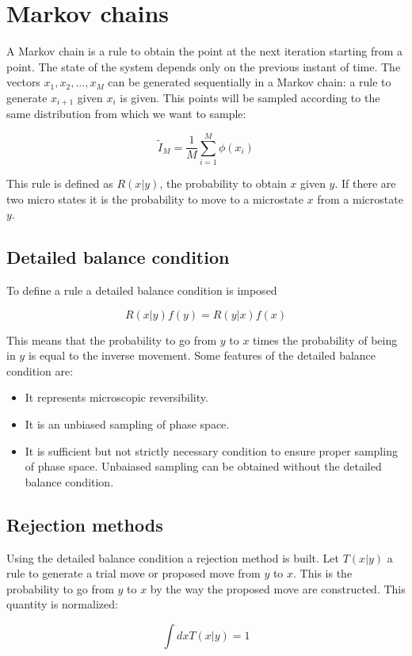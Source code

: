\section{Markov chains}
A Markov chain is a rule to obtain the point at the next iteration starting from a point.
The state of the system depends only on the previous instant of time.
The vectors $x_1, x_2, \dots, x_M$ can be generated sequentially in a Markov chain: a rule to generate $x_{i+1}$ given $x_i$ is given.
This points will be sampled according to the same distribution from which we want to sample:

$$\tilde{I}_M = \frac{1}{M}\sum\limits_{i=1}^M\phi(x_i)$$

This rule is defined as $R(x|y)$,  the probability to obtain $x$ given $y$.
If there are two micro states it is the probability to move to a microstate $x$ from a microstate $y$.

	\subsection{Detailed balance condition}
	To define a rule a detailed balance condition is imposed

	$$R(x|y)f(y) = R(y|x)f(x)$$

	This means that the probability to go from $y$ to $x$ times the probability of being in $y$  is equal to the inverse movement.
	Some features of the detailed balance condition are:

	\begin{itemize}
		\item It represents microscopic reversibility.
		\item It is an unbiased sampling of phase space.
		\item It is sufficient but not strictly necessary condition to ensure proper sampling of phase space.
			Unbaiased sampling can be obtained without the detailed balance condition.
	\end{itemize}

	\subsection{Rejection methods}
	Using the detailed balance condition a rejection method is built.
	Let $T(x|y)$ a rule to generate a trial move or proposed move from $y$ to $x$.
	This is the probability to go from $y$ to $x$ by the way the proposed move are constructed.
	This quantity is normalized:

	$$\int dxT(x|y) = 1$$

